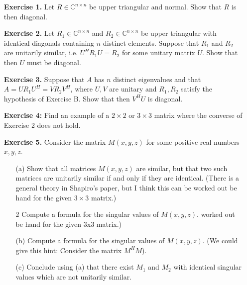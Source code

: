 \documentclass[14pt]{report}
\begin{document}
\begin{enumerate}
  \item[\textbf{Exercise 1.}] Let $R\in\mathbb{C}^{n\times n}$ be upper 
    triangular and normal. Show that $R$ is then diagonal. 

  \item[\textbf{Exercise 2.}] Let $R_1\in\mathbb{C}^{n\times n}$ and
    $R_2\in\mathbb{C}^{n\times n}$ be upper triangular with identical diagonals
    containing $n$ distinct elements. Suppose that $R_1$ and $R_2$ are 
    unitarily similar, i.e. $U^HR_1U = R_2$ for some unitary matrix $U$.
    Show that then $U$ must be diagonal.

  \item[\textbf{Exercise 3.}] Suppose that $A$ has $n$ distinct eigenvalues and
    that $A = U R_1 U^H = V R_2 V^H$, where $U,V$ are unitary and 
    $R_1, R_2$ satisfy the hypothesis of Exercise B. Show that then $V^H U$ is
    diagonal.

  \item[\textbf{Exercise 4:}] Find an example of a $2\times2$ or $3\times3$
    matrix where the converse of Exercise 2 does not hold.

  \item[\textbf{Exercise 5.}] Consider the matrix $M(x,y,z)$ for some positive
    real numbers $x,y,z$.
    \begin{enumerate}
      \item[(a)] Show that all matrices $M(x,y,z)$ are similar, but that two
         such matrices are unitarily similar if and only if they are identical.
        (There is a general theory in Shapiro's paper, but I think this can be
        worked out be hand for the given $3\times3$ matrix.)
      \item[2] Compute a formula for the singular values of $M(x,y,z)$. 
        worked out be hand for the given 3x3 matrix.)
      \item[(b)] Compute a formula for the singular values of $M(x,y,z)$. 
        (We could give this hint: Consider the matrix $M^H M$).
      \item[(c)] Conclude using (a) that there exist $M_1$ and $M_2$ with
        identical singular values which are not unitarily similar.
      \end{enumerate}
  

\end{enumerate}
\end{document}

